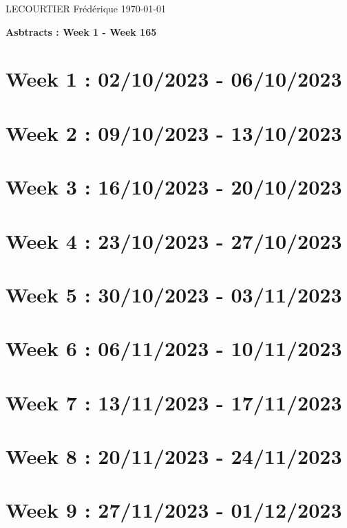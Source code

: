 \documentclass[french]{article}
\begin{document}
	LECOURTIER Frédérique \hfill \today
	\begin{center}
		\Large\textbf{{Asbtracts : Week 1 - Week 165}}
	\end{center}

	\section{Week 1 : 02/10/2023 - 06/10/2023}
	

	\section{Week 2 : 09/10/2023 - 13/10/2023}
	

	\section{Week 3 : 16/10/2023 - 20/10/2023}
	

	\section{Week 4 : 23/10/2023 - 27/10/2023}
	

	\section{Week 5 : 30/10/2023 - 03/11/2023}
	

	\section{Week 6 : 06/11/2023 - 10/11/2023}
	

	\section{Week 7 : 13/11/2023 - 17/11/2023}
	

	\section{Week 8 : 20/11/2023 - 24/11/2023}
	

	\section{Week 9 : 27/11/2023 - 01/12/2023}
	
\end{document}
